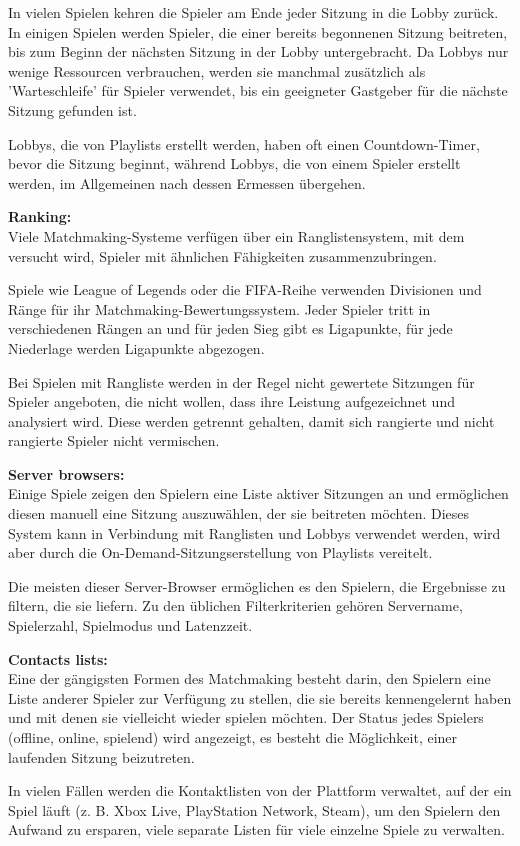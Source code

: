 In vielen Spielen kehren die Spieler am Ende jeder Sitzung in die Lobby zurück. In einigen Spielen werden Spieler, die einer bereits begonnenen Sitzung beitreten, bis zum Beginn der nächsten Sitzung in der Lobby untergebracht. Da Lobbys nur wenige Ressourcen verbrauchen, werden sie manchmal zusätzlich als 'Warteschleife' für Spieler verwendet, bis ein geeigneter Gastgeber für die nächste Sitzung gefunden ist.

Lobbys, die von Playlists erstellt werden, haben oft einen Countdown-Timer, bevor die Sitzung beginnt, während Lobbys, die von einem Spieler erstellt werden, im Allgemeinen nach dessen Ermessen übergehen.

\cite{Wikipedia.2021b}

\textbf{Ranking:} \\
Viele Matchmaking-Systeme verfügen über ein Ranglistensystem, mit dem versucht wird, Spieler mit ähnlichen Fähigkeiten zusammenzubringen.

Spiele wie League of Legends oder die FIFA-Reihe verwenden Divisionen und Ränge für ihr Matchmaking-Bewertungssystem. Jeder Spieler tritt in verschiedenen Rängen an und für jeden Sieg gibt es Ligapunkte, für jede Niederlage werden Ligapunkte abgezogen.

Bei Spielen mit Rangliste werden in der Regel nicht gewertete Sitzungen für Spieler angeboten, die nicht wollen, dass ihre Leistung aufgezeichnet und analysiert wird. Diese werden getrennt gehalten, damit sich rangierte und nicht rangierte Spieler nicht vermischen.

\cite{Wikipedia.2021b}

\textbf{Server browsers:} \\
Einige Spiele zeigen den Spielern eine Liste aktiver Sitzungen an und ermöglichen diesen manuell eine Sitzung auszuwählen, der sie beitreten möchten. Dieses System kann in Verbindung mit Ranglisten und Lobbys verwendet werden, wird aber durch die On-Demand-Sitzungserstellung von Playlists vereitelt.

Die meisten dieser Server-Browser ermöglichen es den Spielern, die Ergebnisse zu filtern, die sie liefern. Zu den üblichen Filterkriterien gehören Servername, Spielerzahl, Spielmodus und Latenzzeit. 

\cite{Wikipedia.2021b}

\textbf{Contacts lists:} \\
Eine der gängigsten Formen des Matchmaking besteht darin, den Spielern eine Liste anderer Spieler zur Verfügung zu stellen, die sie bereits kennengelernt haben und mit denen sie vielleicht wieder spielen möchten. Der Status jedes Spielers (offline, online, spielend) wird angezeigt, es besteht die Möglichkeit, einer laufenden Sitzung beizutreten.

In vielen Fällen werden die Kontaktlisten von der Plattform verwaltet, auf der ein Spiel läuft (z. B. Xbox Live, PlayStation Network, Steam), um den Spielern den Aufwand zu ersparen, viele separate Listen für viele einzelne Spiele zu verwalten. \cite{Wikipedia.2021b}
